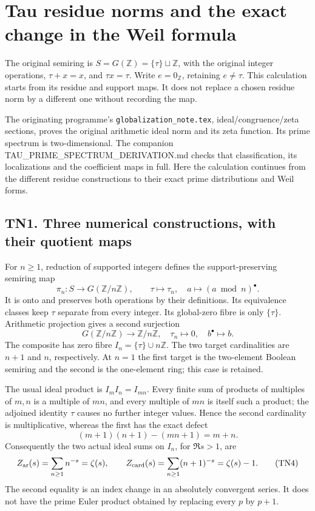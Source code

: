 \documentclass[
  10pt,
  a4paper,
]{article}
\author{}
\date{}
\begin{document}
{
\setcounter{tocdepth}{3}
\tableofcontents
}
\section{Tau residue norms and the exact change in the Weil
formula}\label{tau-residue-norms-and-the-exact-change-in-the-weil-formula}

The original semiring is \(S=G(\mathbb Z)=\{\tau\}\sqcup\mathbb Z\),
with the original integer operations, \(\tau+x=x\), and \(\tau x=\tau\).
Write \(e=0_{\mathbb Z}\), retaining \(e\ne\tau\). This calculation
starts from its residue and support maps. It does not replace a chosen
residue norm by a different one without recording the map.

The originating programme's \texttt{globalization\_\allowbreak{}note.\allowbreak{}tex},
ideal/congruence/zeta sections, proves the original arithmetic ideal
norm and its zeta function. Its prime spectrum is two-dimensional. The
companion TAU\_PRIME\_SPECTRUM\_DERIVATION.md checks that
classification, its localizations and the coefficient maps in full. Here
the calculation continues from the different residue constructions to
their exact prime distributions and Weil forms.

\subsection{TN1. Three numerical constructions, with their quotient
maps}\label{tn1.-three-numerical-constructions-with-their-quotient-maps}

For \(n\ge1\), reduction of supported integers defines the
support-preserving semiring map \[
\pi_n:S\longrightarrow G(\mathbb Z/n\mathbb Z),\qquad
\tau\longmapsto\tau_n,\quad a\longmapsto(a\bmod n)^\bullet.
\tag{TN1}
\] It is onto and preserves both operations by their definitions. Its
equivalence classes keep \(\tau\) separate from every integer. Its
global-zero fibre is only \(\{\tau\}\). Arithmetic projection gives a
second surjection \[
G(\mathbb Z/n\mathbb Z)\longrightarrow\mathbb Z/n\mathbb Z,
\quad\tau_n\longmapsto0,\quad b^\bullet\longmapsto b.
\tag{TN2}
\] The composite has zero fibre \(I_n=\{\tau\}\cup n\mathbb Z\). The two
target cardinalities are \(n+1\) and \(n\), respectively. At \(n=1\) the
first target is the two-element Boolean semiring and the second is the
one-element ring; this case is retained.

The usual ideal product is \(I_mI_n=I_{mn}\). Every finite sum of
products of multiples of \(m,n\) is a multiple of \(mn\), and every
multiple of \(mn\) is itself such a product; the adjoined identity
\(\tau\) causes no further integer values. Hence the second cardinality
is multiplicative, whereas the first has the exact defect \[
(m+1)(n+1)-(mn+1)=m+n.
\tag{TN3}
\] Consequently the two actual ideal sums on \(I_n\), for \(\Re s>1\),
are \[
Z_{\rm ar}(s)=\sum_{n\ge1}n^{-s}=\zeta(s),\qquad
Z_{\rm card}(s)=\sum_{n\ge1}(n+1)^{-s}=\zeta(s)-1.
\tag{TN4}
\] The second equality is an index change in an absolutely convergent
series. It does not have the prime Euler product obtained by replacing
every \(p\) by \(p+1\).
\end{document}

